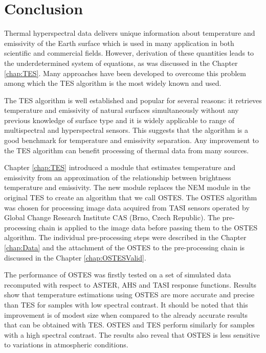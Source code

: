 \chapter{Conclusion}

Thermal hyperspectral data delivers unique information about temperature and emissivity of the Earth surface which is used in many application in both scientific and commercial fields. However, derivation of these quantities leads to the underdetermined system of equations, as was discussed in the Chapter \ref{chap:TES}. Many approaches have been developed to overcome this problem among which the TES algorithm is the most widely known and used. 

The TES algorithm is well established and popular for several reasons: it retrieves temperature and emissivity of natural surfaces simultaneously without any previous knowledge of surface type and it is widely applicable to range of multispectral and hyperspectral sensors. This suggests that the algorithm is a good benchmark for temperature and emissivity separation. Any improvement to the TES algorithm can benefit processing of thermal data from many sources.

Chapter \ref{chap:TES} introduced a module that estimates temperature and emissivity from an approximation of the relationship between brightness temperature and emissivity. The new module replaces the NEM module in the original TES to create an algorithm that we call OSTES. The OSTES algorithm was chosen for processing image data acquired from TASI sensors operated by Global Change Research Institute CAS (Brno, Czech Republic). The pre-processing chain is applied to the image data before passing them to the OSTES algorithm. The individual pre-processing steps were described in the Chapter \ref{chap:Data} and the attachment of the OSTES to the pre-processing chain is discussed in the Chapter \ref{chap:OSTESValid}.

The performance of OSTES was firstly tested on a set of simulated data recomputed with respect to ASTER, AHS and TASI response functions. Results show that temperature estimations using OSTES are more accurate and precise than TES for samples with low spectral contrast. It should be noted that this improvement is of modest size when compared to the already accurate results that can be obtained with TES. OSTES and TES perform similarly for samples with a high spectral contrast. The results also reveal that OSTES is less sensitive to variations in atmospheric conditions.

